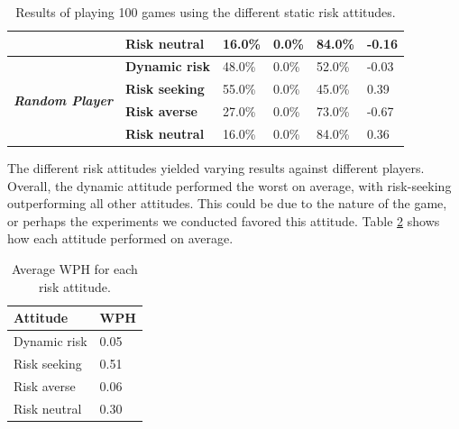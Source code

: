 \begin{table}[h]
\begin{tabular}{ll|l|l|l|l|}
    \multicolumn{1}{|l|}{}                                                 & \textbf{Risk neutral} &    16.0\%    &     0.0\%     &     84.0\%    &    -0.16     \\ \hline
    \multicolumn{1}{|l|}{\multirow{4}{*}{\textit{\textbf{Random Player}}}} & \textbf{Dynamic risk} &    48.0\%    &     0.0\%     &     52.0\%    &    -0.03     \\ \cline{2-6} 
    \multicolumn{1}{|l|}{}                                                 & \textbf{Risk seeking} &    55.0\%    &     0.0\%     &     45.0\%    &     0.39     \\ \cline{2-6} 
    \multicolumn{1}{|l|}{}                                                 & \textbf{Risk averse}  &    27.0\%    &     0.0\%     &     73.0\%    &    -0.67     \\ \cline{2-6} 
    \multicolumn{1}{|l|}{}                                                 & \textbf{Risk neutral} &    16.0\%    &     0.0\%     &     84.0\%    &     0.36     \\ \hline
    \end{tabular}
    \caption{Results of playing 100 games using the different static risk attitudes.}
    \label{table:staticRiskAttitude}
\end{table}

The different risk attitudes yielded varying results against different players. Overall, the dynamic attitude performed the worst on average, with risk-seeking outperforming all other attitudes. This could be due to the nature of the game, or perhaps the experiments we conducted favored this attitude. Table \ref{table:average} shows how each attitude performed on average.

\begin{table}[h]
    \centering
    \begin{tabular}{|l|l|}
    \hline
    \textbf{Attitude} & \textbf{WPH} \\ \hline
    Dynamic risk      & 0.05         \\ \hline
    Risk seeking      & 0.51         \\ \hline
    Risk averse       & 0.06         \\ \hline
    Risk neutral      & 0.30         \\ \hline
    \end{tabular}
    \caption{Average WPH for each risk attitude.}
    \label{table:average}
\end{table}



